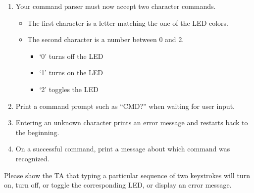 \documentclass[openany,11pt,fleqn]{book} %
\begin{document}
\begin{exercise}
	\begin{enumerate}
	    \item Your command parser must now accept two character commands.
	    \begin{itemize}
	        \item The first character is a letter matching the one of the LED colors.
	        \item The second character is a number between 0 and 2. 
	        \begin{itemize}
	            \item `0' turns off the LED
	            \item `1' turns on the LED
	            \item `2' toggles the LED
	        \end{itemize}
	    \end{itemize}
	    \item Print a command prompt such as ``CMD?'' when waiting for user input.
	    \item Entering an unknown character prints an error message and restarts back to the beginning.
	    \item On a successful command, print a message about which command was recognized. 
	\end{enumerate}
\end{exercise}

\begin{assignment}
	Please show the TA that typing a particular sequence of two keystrokes will turn on, turn off, or toggle the corresponding LED, or display an error message.
\end{assignment}
\end{document}

